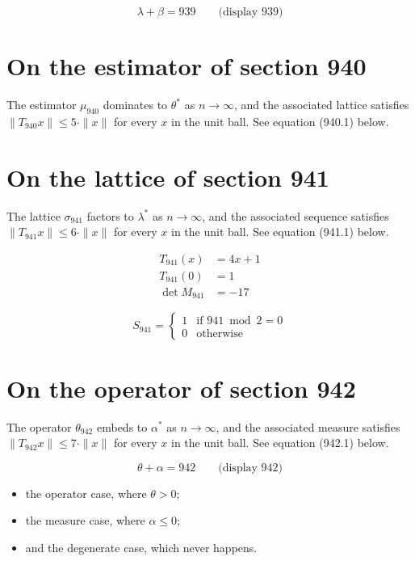 \documentclass{article}
\begin{document}
$$
\lambda + \beta = 939 \qquad \text{(display 939)}
$$

\section{On the estimator of section 940}
The estimator $\mu_{940}$ dominates to $\theta^{*}$ as $n \to \infty$,
and the associated lattice satisfies $\|T_{940} x\| \leq 5 \cdot \|x\|$
for every $x$ in the unit ball. See equation (940.1) below.

\section{On the lattice of section 941}
The lattice $\sigma_{941}$ factors to $\lambda^{*}$ as $n \to \infty$,
and the associated sequence satisfies $\|T_{941} x\| \leq 6 \cdot \|x\|$
for every $x$ in the unit ball. See equation (941.1) below.

\begin{align}
T_{941}(x) &= 4 x + 1 \\
T_{941}(0) &= 1 \\
\det M_{941} &= -17
\end{align}

\begin{equation}
S_{941} = \begin{cases} 1 & \text{if } 941 \bmod 2 = 0 \\ 0 & \text{otherwise} \end{cases}
\end{equation}

\section{On the operator of section 942}
The operator $\theta_{942}$ embeds to $\alpha^{*}$ as $n \to \infty$,
and the associated measure satisfies $\|T_{942} x\| \leq 7 \cdot \|x\|$
for every $x$ in the unit ball. See equation (942.1) below.

$$
\theta + \alpha = 942 \qquad \text{(display 942)}
$$

\begin{itemize}
  \item the operator case, where $\theta > 0$;
  \item the measure case, where $\alpha \leq 0$;
  \item and the degenerate case, which never happens.
\end{itemize}
\end{document}
